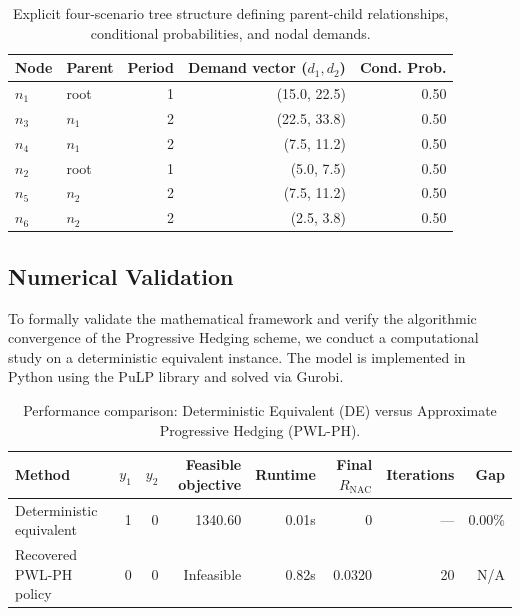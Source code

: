 \documentclass[11pt,a4paper]{article}
\begin{document}
\begin{table}[ht]\small
\centering
\caption{Explicit four-scenario tree structure defining parent-child relationships, conditional probabilities, and nodal demands.}
\begin{tabular}{llrrr}
\toprule
Node & Parent & Period & Demand vector ($d_1, d_2$) & Cond. Prob. \\
\midrule
$n_1$ & root & 1 & (15.0, 22.5) & 0.50 \\
$n_3$ & $n_{1}$ & 2 & (22.5, 33.8) & 0.50 \\
$n_4$ & $n_{1}$ & 2 & (7.5, 11.2) & 0.50 \\
$n_2$ & root & 1 & (5.0, 7.5) & 0.50 \\
$n_5$ & $n_{2}$ & 2 & (7.5, 11.2) & 0.50 \\
$n_6$ & $n_{2}$ & 2 & (2.5, 3.8) & 0.50 \\
\bottomrule
\end{tabular}
\label{tab:tree}
\end{table}


\label{sec:comp-study}

\subsection{Numerical Validation}
\label{ssec:numerical-validation}

To formally validate the mathematical framework and verify the algorithmic convergence of the Progressive Hedging scheme, we conduct a computational study on a deterministic equivalent instance. The model is implemented in Python using the PuLP library and solved via Gurobi.

\begin{table}[ht]\small
\centering
\caption{Performance comparison: Deterministic Equivalent (DE) versus Approximate Progressive Hedging (PWL-PH).}
\begin{tabular}{lrrrrrrr}
\toprule
Method & $y_1$ & $y_2$ & Feasible objective & Runtime & Final $R_{\mathrm{NAC}}$ & Iterations & Gap \\
\midrule
Deterministic equivalent & 1 & 0 & 1340.60 & 0.01s & 0 & --- & 0.00\% \\
Recovered PWL-PH policy & 0 & 0 & Infeasible & 0.82s & 0.0320 & 20 & N/A \\
\bottomrule
\end{tabular}
\label{tab:ph_performance}
\end{table}
\end{document}
